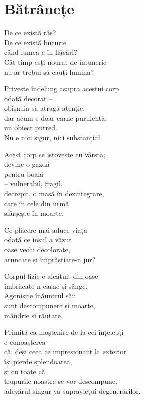 
\chapter{Bătrânețe}


De ce există râs?\\
De ce există bucurie\\
când lumea e în flăcări?\\
Cât timp esți nourat de întuneric\\
nu ar trebui să cauți lumina?


Privește îndelung asupra acestui corp\\
odată decorat –\\
obișnuia să atragă atenție,\\
dar acum e doar carne purulentă,\\
un obiect putred.\\
Nu e nici sigur, nici substanțial.


Acest corp se istovește cu vârsta;\\
devine o gazdă\\
pentru boală\\
– vulnerabil, fragil,\\
decrepit, o masă în dezintegrare,\\
care în cele din urmă\\
sfârșește în moarte.


Ce plăcere mai aduce viața\\
odată ce insul a văzut\\
oase vechi decolorate,\\
aruncate și împrăștiate-n jur?


Corpul fizic e alcătuit din oase\\
îmbrăcate-n carne și sânge.\\
Agonisite înăuntrul său\\
sunt descompunere și moarte,\\
mândrie și răutate.


Primită ca moștenire de la cei înțelepți\\
e cunoașterea\\
că, deși ceea ce impresionant la exterior\\
își pierde splendoarea,\\
și cu toate că\\
trupurile noastre se vor descompune,\\
adevărul singur va supraviețui degenerărilor.

